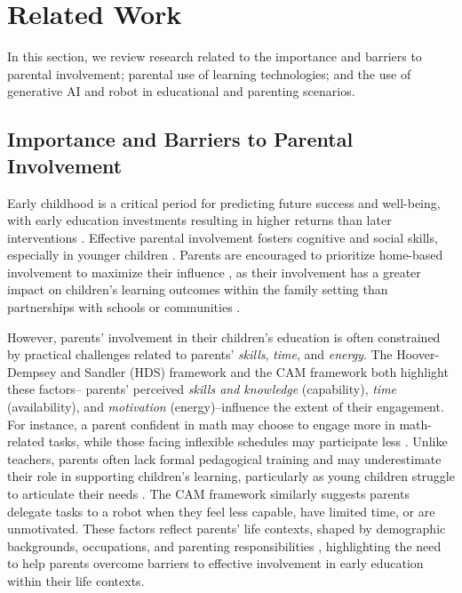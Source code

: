 \section{Related Work}
In this section, we review research related to the importance and barriers to parental involvement; parental use of learning technologies; and the use of generative AI and robot in educational and parenting scenarios.

\subsection{Importance and Barriers to Parental Involvement}\label{sec-rw-2.1}

Early childhood is a critical period for predicting future success and well-being, with early education investments resulting in higher returns than later interventions \cite{duncan2007school, doyle2009investing}. Effective parental involvement fosters cognitive and social skills, especially in younger children \cite{blevins2016early, peck1992parent}. Parents are encouraged to prioritize home-based involvement to maximize their influence \cite{ma2016meta}, as their involvement has a greater impact on children's learning outcomes \cite{hoffner2002parents, fehrmann1987home, hill2004parent} within the family setting than partnerships with schools or communities \cite{ma2016meta, harris2008parents, fantuzzo2004multiple, sui1996effects}.

However, parents' involvement in their children's education is often constrained by practical challenges related to parents' \textit{skills}, \textit{time}, and \textit{energy}. The Hoover-Dempsey and Sandler (HDS) framework \cite{green2007parents} and the CAM framework \cite{ho2024s} both highlight these factors-- parents' perceived \textit{skills and knowledge} (capability), \textit{time} (availability), and \textit{motivation} (energy)--influence the extent of their engagement. For instance, a parent confident in math may choose to engage more in math-related tasks, while those facing inflexible schedules may participate less \cite{green2007parents}. Unlike teachers, parents often lack formal pedagogical training and may underestimate their role in supporting children's learning, particularly as young children struggle to articulate their needs \cite{hara1998parent}. The CAM framework similarly suggests parents delegate tasks to a robot when they feel less capable, have limited time, or are unmotivated. These factors reflect parents' life contexts, shaped by demographic backgrounds, occupations, and parenting responsibilities \cite{grolnick1997predictors}, highlighting the need to help parents overcome barriers to effective involvement in early education within their life contexts.

